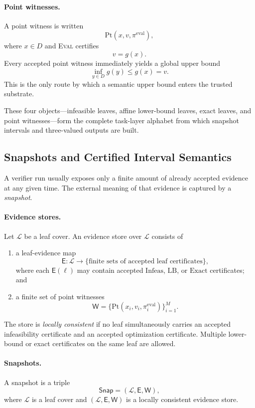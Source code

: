 \paragraph{Point witnesses.}
A point witness is written
\[
\mathrm{Pt}(x,v,\pi^{\mathrm{eval}}),
\]
where $x\in D$ and \textsc{Eval} certifies
\[
v=g(x).
\]
Every accepted point witness immediately yields a global upper bound
\[
\inf_{y\in D} g(y)\le g(x)=v.
\]
This is the only route by which a semantic upper bound enters the trusted substrate.

These four objects---infeasible leaves, affine lower-bound leaves, exact leaves, and point witnesses---form the complete task-layer alphabet from which snapshot intervals and three-valued outputs are built.

\subsection{Snapshots and Certified Interval Semantics}

A verifier run usually exposes only a finite amount of already accepted evidence at any given time. The external meaning of that evidence is captured by a \emph{snapshot}.

\paragraph{Evidence stores.}
Let $\mathcal L$ be a leaf cover. An evidence store over $\mathcal L$ consists of
\begin{enumerate}
    \item a leaf-evidence map
    \[
    \mathsf E:\mathcal L\to \{\text{finite sets of accepted leaf certificates}\},
    \]
    where each $\mathsf E(\ell)$ may contain accepted \(\mathrm{Infeas}\), \(\mathrm{LB}\), or \(\mathrm{Exact}\) certificates; and
    \item a finite set of point witnesses
    \[
    \mathsf W=\{\mathrm{Pt}(x_i,v_i,\pi_i^{\mathrm{eval}})\}_{i=1}^M.
    \]
\end{enumerate}
The store is \emph{locally consistent} if no leaf simultaneously carries an accepted infeasibility certificate and an accepted optimization certificate. Multiple lower-bound or exact certificates on the same leaf are allowed.

\paragraph{Snapshots.}
A snapshot is a triple
\[
\mathsf{Snap}=(\mathcal L,\mathsf E,\mathsf W),
\]
where $\mathcal L$ is a leaf cover and $(\mathcal L,\mathsf E,\mathsf W)$ is a locally consistent evidence store.

